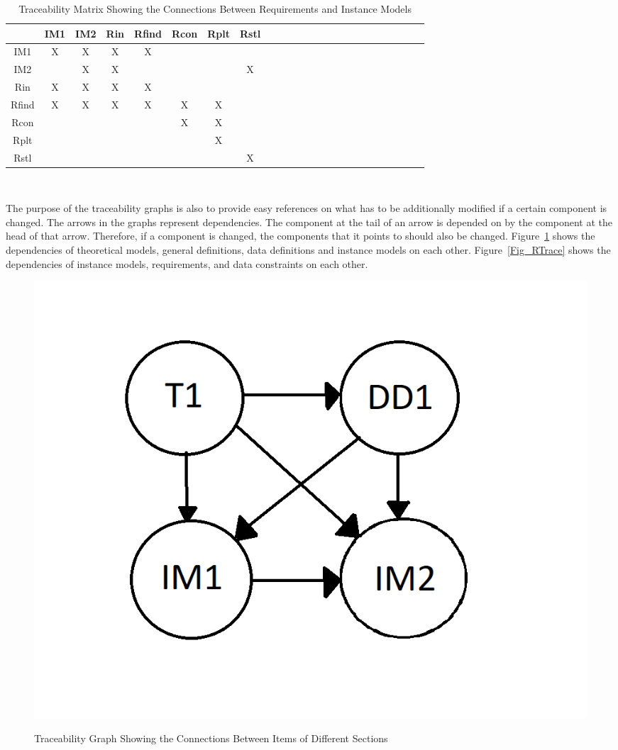 \documentclass[12pt]{article}
\begin{document}
\begin{table}[h!]
	\centering
	\begin{tabular}{|c|c|c|c|c|c|c|c|c|c|c|c|c|c|c|c|c|c|c|c|c|c|c|c|}
		\hline        
		& IM1& IM2& Rin & Rfind & Rcon & Rplt & Rstl \\
		\hline
		IM1     &X &X &X &X & & &  \\ \hline
		IM2    & &X &X & & & &X \\ \hline
		Rin    &X &X &X &X & & & \\ \hline 
		Rfind    &X &X &X &X &X &X &    \\ \hline 
		Rcon   & & & & &X &X & \\ \hline
		Rplt   & & & & & &X & \\ \hline
		Rstl   & & & & & & &X \\
		\hline
	\end{tabular}\\
	\caption{Traceability Matrix Showing the Connections Between Requirements 
	and Instance Models}
	\label{Table:R_trace}
\end{table}

The purpose of the traceability graphs is also to provide easy references on
what has to be additionally modified if a certain component is changed.  The
arrows in the graphs represent dependencies. The component at the tail of an
arrow is depended on by the component at the head of that arrow. Therefore, if a
component is changed, the components that it points to should also be
changed. Figure~\ref{Fig_ATrace} shows the dependencies of theoretical models,
general definitions, data definitions and instance models on each other. 
Figure~\ref{Fig_RTrace} shows the dependencies of
instance models, requirements, and data constraints on each other.

\begin{figure}[h!]
	\begin{center}
		
		{
			\includegraphics[width=\textwidth]{ATrace.png}
		}
		\caption{\label{Fig_ATrace} Traceability Graph Showing the Connections 
		Between Items of Different Sections}
 	\end{center}
 \end{figure}
\end{document}
